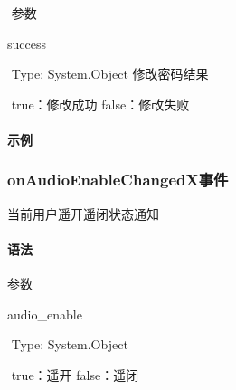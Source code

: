 \documentclass[letterpaper,10pt,english]{sphinxmanual}
\begin{document}
​ 参数

success

​ Type: System.Object 修改密码结果

​ true：修改成功 false：修改失败


\paragraph{示例}
\label{\detokenize{csharp_activex:id51}}
%
\begin{sphinxVerbatim}[commandchars=\\\{\}]
    
\end{sphinxVerbatim}


\subsubsection{onAudioEnableChangedX事件}
\label{\detokenize{csharp_activex:onaudioenablechangedx}}
当前用户遥开遥闭状态通知


\paragraph{语法}
\label{\detokenize{csharp_activex:id52}}
%
\begin{sphinxVerbatim}[commandchars=\\\{\}]
  
\end{sphinxVerbatim}

参数

audio\_enable

​ Type: System.Object

​ true：遥开 false：遥闭
\end{document}
